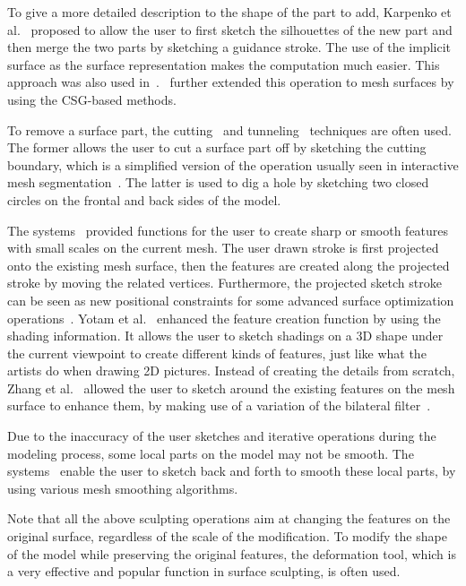 To give a more detailed description to the shape of  the part to
add, Karpenko et al.~\cite{KHR02} proposed to allow the user to
first sketch the silhouettes of the new part and then merge the two
parts by sketching a guidance stroke. The use of the implicit
surface as the surface representation makes the computation much
easier. This approach was also used
in~\cite{AJ03,AGB04,TZF04,SWSJ05,SSB08,WBC08}.~\cite{WM07,RDI10,LMZ11}
further extended this operation to mesh surfaces by using the
CSG-based methods.

To remove a surface part, the cutting~\cite{IMT99,NISA07,MI07,LMZ11} and tunneling~\cite{IMT99,NISA07,SWSJ05,SSB08} techniques are often used. The former allows the user to cut a surface part off by sketching the cutting boundary, which is a simplified version of the operation usually seen in interactive mesh segmentation~\cite{SA08}. The latter is used to dig a hole by sketching two closed circles on the frontal and back sides of the model.

The systems~\cite{NSAC05,OSSJ05,SWSJ05,NISA07} provided  functions
for the user to create sharp or smooth features with small scales on
the current mesh. The user drawn stroke is first projected onto the
existing mesh surface, then the features are created along the
projected stroke by moving the related vertices. Furthermore, the
projected sketch stroke can be seen as new positional constraints
for some advanced surface optimization
operations~\cite{NISA07,EP09}. Yotam et al.~\cite{GZ08} enhanced the
feature creation function by using the shading information. It
allows the user to sketch shadings on a 3D shape under the current
viewpoint to create different kinds of features, just like what the
artists do when drawing 2D pictures. Instead of creating the details
from scratch, Zhang et al.~\cite{ZCFWP10} allowed the user to sketch
around the existing features on the mesh surface to enhance them, by
making use of a variation of the bilateral
filter~\cite{JDD03,FDC03}.

Due to the inaccuracy of the user sketches and iterative  operations
during the modeling process, some local parts on the model may not
be smooth. The systems~\cite{IMT99,NISA07,LMZ11} enable the user to
sketch back and forth to smooth these local parts, by using various
mesh smoothing algorithms.


Note that all the above sculpting operations aim at changing  the
features on the original surface, regardless of the scale of the
modification. To modify the shape of the model while preserving the
original features, the deformation tool, which is a very effective
and popular function in surface sculpting, is often used.

